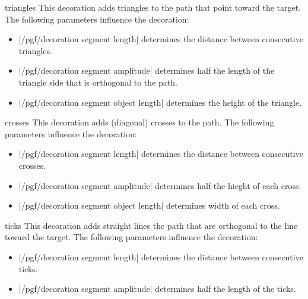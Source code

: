 \begin{decoration}{triangles}
	This decoration adds triangles to the path that point toward the
  target. The following parameters influence the decoration: 
  \begin{itemize}
  \item |/pgf/decoration segment length|
    determines the distance between consecutive triangles.
  \item |/pgf/decoration segment amplitude|
    determines half the length of the triangle side that is orthogonal
    to the path.
  \item |/pgf/decoration segment object length|
    determines the height of the triangle.
  \end{itemize}
\begin{codeexample}[]
\end{codeexample}
\end{decoration}

\begin{decoration}{crosses}
	This decoration adds (diagonal) crosses to the path. The following
  parameters influence the decoration:  
  \begin{itemize}
  \item |/pgf/decoration segment length|
    determines the distance between consecutive crosses.
  \item |/pgf/decoration segment amplitude|
    determines half the hieght of each cross.
  \item |/pgf/decoration segment object length|
    determines width of each cross.
  \end{itemize}
\begin{codeexample}[]
\end{codeexample}
\end{decoration}

\begin{decoration}{ticks}
  This decoration adds straight lines  the path that are orthogonal to 
  the line toward the target. The following parameters influence the 
  decoration: 
  \begin{itemize}
  \item |/pgf/decoration segment length|
    determines the distance between consecutive ticks.
  \item |/pgf/decoration segment amplitude|
    determines half the length of the ticks.
  \end{itemize}
\begin{codeexample}[]
\end{codeexample}
\end{decoration}


